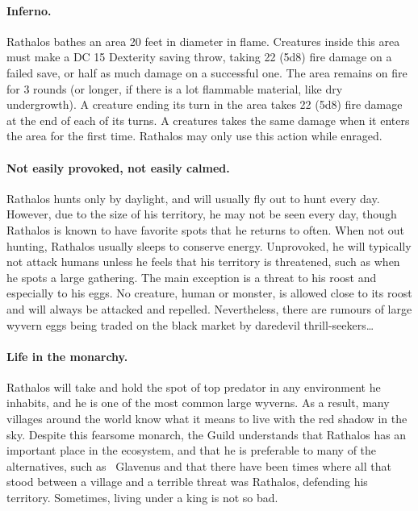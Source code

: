 \begin{hbMonsterNoteWide}[b]
\begin{multicols}{2}
\begin{hbStatBlock}
\paragraph*{Inferno.} Rathalos bathes an area 20 feet in diameter in flame. Creatures inside this area must make a DC 15 Dexterity saving throw, taking 22 (5d8) fire damage on a failed save, or half as much damage on a successful one. The area remains on fire for 3 rounds (or longer, if there is a lot flammable material, like dry undergrowth). A creature ending its turn in the area takes 22 (5d8) fire damage at the end of each of its turns. A creatures takes the same damage when it enters the area for the first time. Rathalos may only use this action while enraged.

\end{hbStatBlock}
\end{multicols}
\end{hbMonsterNoteWide}

\paragraph*{Not easily provoked, not easily calmed.} Rathalos hunts only by daylight, and will usually fly out to hunt every day. However, due to the size of his territory, he may not be seen every day, though Rathalos is known to have favorite spots that he returns to often. When not out hunting, Rathalos usually sleeps to conserve energy. Unprovoked, he will typically not attack humans unless he feels that his territory is threatened, such as when he spots a large gathering. The main exception is a threat to his roost and especially to his eggs. No creature, human or monster, is allowed close to its roost and will always be attacked and repelled. Nevertheless, there are rumours of large wyvern eggs being traded on the black market by daredevil thrill-seekers\ldots

\paragraph*{Life in the monarchy.} Rathalos will take and hold the spot of top predator in any environment he inhabits, and he is one of the most common large wyverns. As a result, many villages around the world know what it means to live with the red shadow in the sky. Despite this fearsome monarch, the Guild understands that Rathalos has an important place in the ecosystem, and that he is preferable to many of the alternatives, such as ~Glavenus and that there have been times where all that stood between a village and a terrible threat was Rathalos, defending his territory. Sometimes, living under a king is not so bad.

